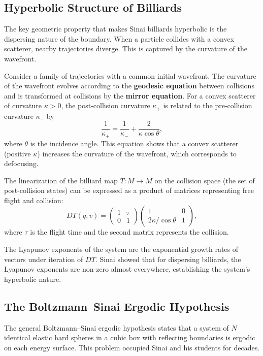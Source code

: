 \subsection{Hyperbolic Structure of Billiards}

The key geometric property that makes Sinai billiards hyperbolic is the dispersing nature of the boundary. When a particle collides with a convex scatterer, nearby trajectories diverge. This is captured by the curvature of the wavefront.

Consider a family of trajectories with a common initial wavefront. The curvature of the wavefront evolves according to the \textbf{geodesic equation} between collisions and is transformed at collisions by the \textbf{mirror equation}. For a convex scatterer of curvature \(\kappa > 0\), the post-collision curvature \(\kappa_+\) is related to the pre-collision curvature \(\kappa_-\) by
\[
\frac{1}{\kappa_+} = \frac{1}{\kappa_-} + \frac{2}{\kappa \cos \theta},
\]
where \(\theta\) is the incidence angle. This equation shows that a convex scatterer (positive \(\kappa\)) increases the curvature of the wavefront, which corresponds to defocusing.

The linearization of the billiard map \(T: M \to M\) on the collision space (the set of post-collision states) can be expressed as a product of matrices representing free flight and collision:
\[
DT(q, v) = \begin{pmatrix} 1 & \tau \\ 0 & 1 \end{pmatrix}
\begin{pmatrix} 1 & 0 \\ 2\kappa/\cos\theta & 1 \end{pmatrix},
\]
where \(\tau\) is the flight time and the second matrix represents the collision.

The Lyapunov exponents of the system are the exponential growth rates of vectors under iteration of \(DT\). Sinai showed that for dispersing billiards, the Lyapunov exponents are non-zero almost everywhere, establishing the system's hyperbolic nature.

\subsection{The Boltzmann--Sinai Ergodic Hypothesis}

The general Boltzmann--Sinai ergodic hypothesis states that a system of \(N\) identical elastic hard spheres in a cubic box with reflecting boundaries is ergodic on each energy surface. This problem occupied Sinai and his students for decades.

